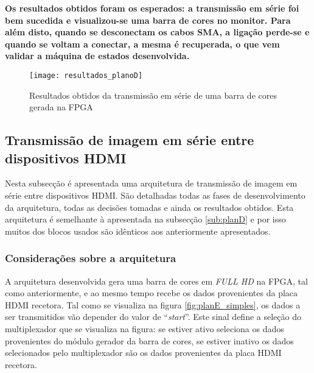 \begin{center}
	\lrboxbrace[\Vert][\Vert] {}
	{\textbf{Os resultados obtidos foram os esperados: a transmissão em série foi bem sucedida e visualizou-se uma barra de cores no monitor. Para além disto, quando se desconectam os cabos SMA, a ligação perde-se e quando se voltam a conectar, a mesma é recuperada, o que vem validar a máquina de estados desenvolvida.}}
\end{center}

\begin{figure}[h!]
	\begin{center}
		\leavevmode
		\texttt{[image: resultados\_planoD]}
		\captionsetup{width=1.0\linewidth}
		\caption[Resultados obtidos da transmissão em série de uma barra de cores gerada na FPGA]{Resultados obtidos da transmissão em série de uma barra de cores gerada na FPGA}
		\label{fig:planD_resultados}
	\end{center}
\end{figure}



\subsection{Transmissão de imagem em série entre dispositivos HDMI} \label{sub:planE}

Nesta subsecção é apresentada uma arquitetura de transmissão de imagem em série entre dispositivos HDMI. São detalhadas todas as fases de desenvolvimento da arquitetura, todas as decisões tomadas e ainda os resultados obtidos. Esta arquitetura é semelhante à apresentada na subsecção \ref{sub:planD} e por isso muitos dos blocos usados são idênticos aos anteriormente apresentados.

\subsubsection{Considerações sobre a arquitetura} \label{subsub:planE_considerações}

A arquitetura desenvolvida gera uma barra de cores em \textit{FULL HD} na FPGA, tal como anteriormente, e ao mesmo tempo recebe os dados provenientes da placa HDMI recetora. Tal como se visualiza na figura \ref{fig:planE_simples}, os dados a ser transmitidos vão depender do valor de ``\textit{start}''. Este sinal define a seleção do multiplexador que se visualiza na figura: se estiver ativo seleciona os dados provenientes do módulo gerador da barra de cores, se estiver inativo os dados selecionados pelo multiplexador são os dados provenientes da placa HDMI recetora.


